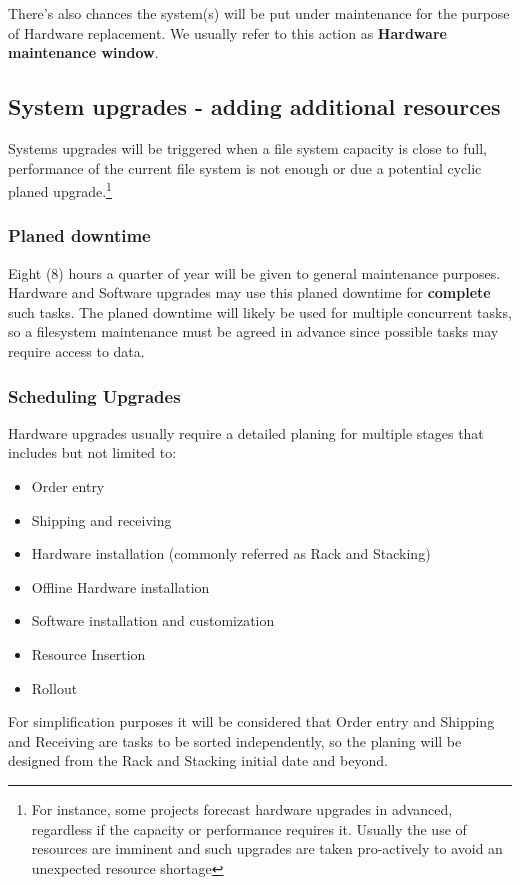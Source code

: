 \documentclass{article}
\begin{document}
There's also chances the system(s) will be put under maintenance for the purpose of Hardware replacement. We usually refer to this action as \textbf{Hardware maintenance window}.

\subsection{System upgrades - adding additional resources}
Systems upgrades will be triggered when a file system capacity is close to full, performance of the current file system is not enough or due a potential cyclic planed upgrade.\footnote{For instance, some projects forecast hardware upgrades in advanced, regardless if the capacity or performance requires it. Usually the use of resources are imminent and such upgrades are taken pro-actively to avoid an unexpected resource shortage}

\subsubsection{Planed downtime}
Eight (8) hours a quarter of year will be given to general maintenance purposes. Hardware and Software upgrades may use this planed downtime for \textbf{complete} such tasks. The planed downtime will likely be used for multiple concurrent tasks, so a filesystem maintenance must be agreed in advance since possible tasks may require access to data. 

\subsubsection{Scheduling Upgrades}

Hardware upgrades usually require a detailed planing for multiple stages that includes but not limited to:
\begin{itemize}
    \item Order entry
    \item Shipping and receiving
    \item Hardware installation (commonly referred as Rack and Stacking)
    \item Offline Hardware installation
    \item Software installation and customization
    \item Resource Insertion
    \item Rollout
\end{itemize}

For simplification purposes it will be considered that Order entry and Shipping and Receiving are tasks to be sorted independently, so the planing will be designed from the Rack and Stacking initial date and beyond.
\end{document}
